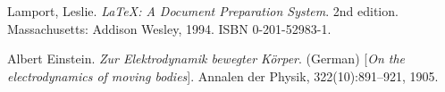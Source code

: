 

\renewcommand{\bibname}{Bibliography}





 \begin{thebibliography}{9}

   {\sc Lamport,} Leslie.
   \emph{\LaTeX: A Document Preparation System}.
   2nd edition.
   Massachusetts: Addison Wesley, 1994.
   ISBN 0-201-52983-1.

   Albert Einstein. 
   \textit{Zur Elektrodynamik bewegter K{\"o}rper}. (German) 
   [\textit{On the electrodynamics of moving bodies}]. 
   Annalen der Physik, 322(10):891–921, 1905.

 \end{thebibliography}
